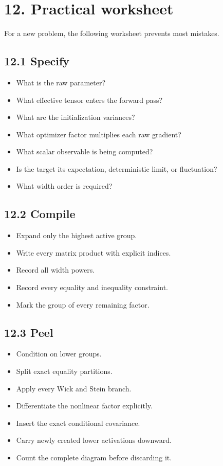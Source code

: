 \section*{12. Practical worksheet}


For a new problem, the following worksheet prevents most mistakes.

\subsection*{12.1 Specify}


\begin{itemize}
\item What is the raw parameter?
\item What effective tensor enters the forward pass?
\item What are the initialization variances?
\item What optimizer factor multiplies each raw gradient?
\item What scalar observable is being computed?
\item Is the target its expectation, deterministic limit, or fluctuation?
\item What width order is required?
\end{itemize}


\subsection*{12.2 Compile}


\begin{itemize}
\item Expand only the highest active group.
\item Write every matrix product with explicit indices.
\item Record all width powers.
\item Record every equality and inequality constraint.
\item Mark the group of every remaining factor.
\end{itemize}


\subsection*{12.3 Peel}


\begin{itemize}
\item Condition on lower groups.
\item Split exact equality partitions.
\item Apply every Wick and Stein branch.
\item Differentiate the nonlinear factor explicitly.
\item Insert the exact conditional covariance.
\item Carry newly created lower activations downward.
\item Count the complete diagram before discarding it.
\end{itemize}


